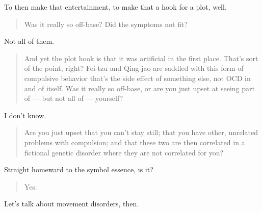 To then make that entertainment, to make that a hook for a plot, well.

\begin{quote}
Was it really so off-base? Did the symptoms not fit?
\end{quote}

Not all of them.

\begin{quote}
And yet the plot hook is that it was artificial in the first place. That's sort of the point, right? Fei-tzu and Qing-jao are saddled with this form of compulsive behavior that's the side effect of something else, not OCD in and of itself. Was it really so off-base, or are you just upset at seeing part of --- but not all of --- yourself?
\end{quote}

I don't know.

\begin{quote}
Are you just upset that you can't stay still; that you have other, unrelated problems with compulsion; and that these two are then correlated in a fictional genetic disorder where they are not correlated for you?
\end{quote}

Straight homeward to the symbol essence, is it?

\begin{quote}
Yes.
\end{quote}

Let's talk about movement disorders, then.
